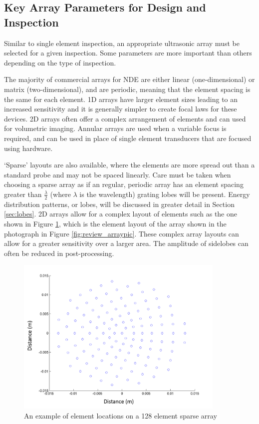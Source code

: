 \subsection{Key Array Parameters for Design and Inspection}\label{review:key_params}

Similar to single element inspection, an appropriate ultrasonic array must be selected for a given inspection. Some parameters are more important than others depending on the type of inspection.

The majority of commercial arrays for NDE are either linear (one-dimensional) or matrix (two-dimensional), and are periodic, meaning that the element spacing is the same for each element. 1D arrays have larger element sizes leading to an increased sensitivity and it is generally simpler to create focal laws for these devices. 2D arrays often offer a complex arrangement of elements and can used for volumetric imaging. Annular arrays are used when a variable focus is required, and can be used in place of single element transducers that are focused using hardware\cite{drinkwater_ultrasonic_2006}.

`Sparse' layouts are also available, where the elements are more spread out than a standard probe and may not be spaced linearly. Care must be taken when choosing a sparse array as if an regular, periodic array has an element spacing greater than $\frac{\lambda}{2}$ (where $\lambda$ is the wavelength) grating lobes will be present\cite{harrington_sidelobe_1961}. Energy distribution patterns, or lobes, will be discussed in greater detail in Section \ref{sec:lobes}. 2D arrays allow for a complex layout of elements such as the one shown in Figure \ref{fig:review_sparse_array}, which is the element layout of the array shown in the photograph in Figure \ref{fig:review_arraypic}. These complex array layouts can allow for a greater sensitivity over a larger area. The amplitude of sidelobes can often be reduced in post-processing\cite{seo_sidelobe_2008}.


\begin{figure}[htp]
\centering
		\includegraphics[width=100mm]{SparseArrayLocations_axes.png}
		\caption{An example of element locations on a 128 element sparse array}
		\label{fig:review_sparse_array}
\end{figure}


